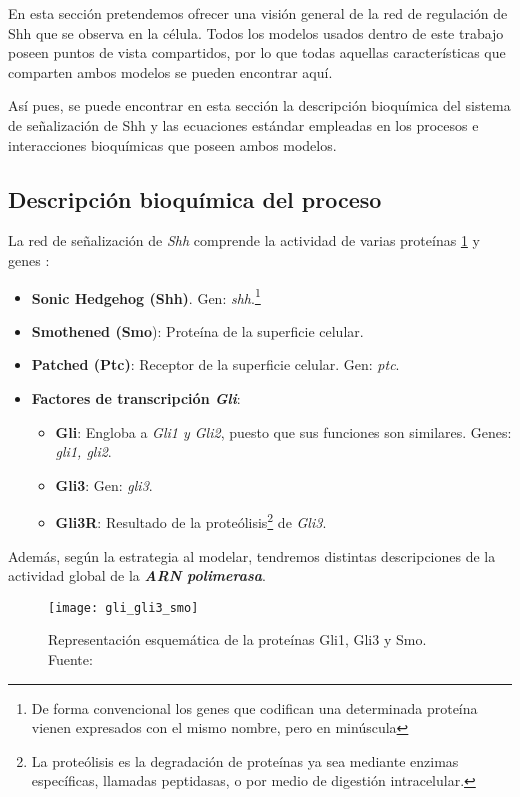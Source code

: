 En esta sección pretendemos ofrecer una visión general de la red de regulación de Shh que se observa en la célula. Todos los modelos usados dentro de este trabajo poseen puntos de vista compartidos, por lo que todas aquellas características que comparten ambos modelos se pueden encontrar aquí.
 
 Así pues, se puede encontrar en esta sección la descripción bioquímica del sistema de señalización de Shh y las ecuaciones estándar empleadas en los procesos e interacciones bioquímicas que poseen ambos modelos.
 
 \subsection{Descripción bioquímica del proceso}
 
 La red de señalización de \textit{Shh} comprende la actividad de varias proteínas \ref{figuras} y genes :
 \begin{itemize}
 	\item \textbf{Sonic Hedgehog (Shh)}. Gen: \textit{shh}.\footnote{ De forma convencional los genes que codifican una determinada proteína vienen expresados con el mismo nombre, pero en minúscula}
 	\item \textbf{Smothened (Smo}): Proteína de la superficie celular.  
 	\item \textbf{Patched (Ptc)}: Receptor de la superficie celular. Gen: \textit{ptc}.
 	\item \textbf{Factores de transcripción \textit{Gli}}:
 	\begin{itemize}
 		\item \textbf{Gli}: Engloba a \textit{Gli1 y Gli2}, puesto que sus funciones son similares. Genes: \textit{gli1, gli2}.
 		\item \textbf{Gli3}: Gen: \textit{gli3}.
 		\item \textbf{Gli3R}: Resultado de la proteólisis\footnote{La proteólisis es la degradación de proteínas ya sea mediante enzimas específicas, llamadas peptidasas, o por medio de digestión intracelular.} de \textit{Gli3}.
 	\end{itemize}
 \end{itemize}
  Además, según la estrategia al modelar, tendremos distintas descripciones de la actividad global de la \textbf{\textit{ARN polimerasa}}. 
 
 \begin{figure}[h]
 	\texttt{[image: gli\_gli3\_smo]}
 	\centering
 	\caption{Representación esquemática de la proteínas Gli1, Gli3 y Smo. Fuente: \cite{phosphosite}}
 	\label{figuras}
 \end{figure}
 
